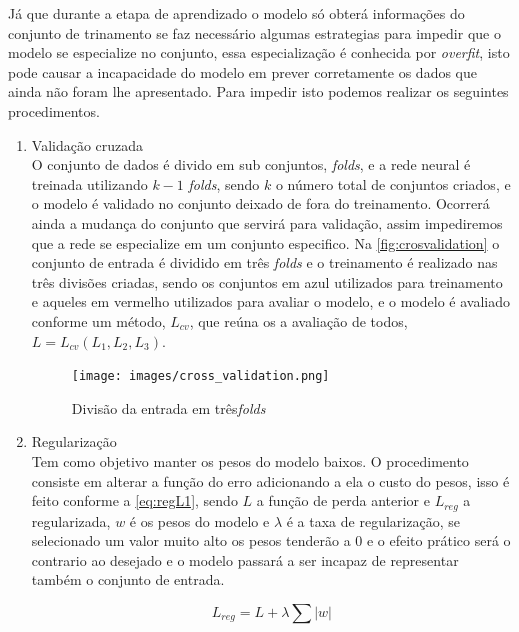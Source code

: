 \documentclass[
    12pt,
    oneside,
    a4paper,
    english,
    brazil
]{abntex2}
\begin{document}
Já  que durante  a  etapa de  aprendizado  o modelo  só  obterá informações  do
conjunto  de trinamento  se  faz necessário  algumas  estrategias para  impedir
que  o modelo  se  especialize  no conjunto,  essa  especialização é  conhecida
por  \textit{overfit}, isto  pode causar  a  incapacidade do  modelo em  prever
corretamente os  dados que ainda não  foram lhe apresentado. Para  impedir isto
podemos realizar os seguintes procedimentos.

\begin{enumerate}
    \item Validação cruzada\\
        O conjunto de dados é divido em sub conjuntos, \textit{folds}, e a rede
        neural é treinada  utilizando $k-1$ \textit{folds}, sendo  $k$ o número
        total de conjuntos  criados, e o modelo é validado  no conjunto deixado
        de  fora do  treinamento.  Ocorrerá  ainda a  mudança  do conjunto  que
        servirá para validação, assim impediremos  que a rede se especialize em
        um conjunto  especifico. Na \autoref{fig:crosvalidation} o  conjunto de
        entrada é dividido  em três \textit{folds} e o  treinamento é realizado
        nas três divisões  criadas, sendo os conjuntos em  azul utilizados para
        treinamento e aqueles em vermelho utilizados para avaliar o modelo, e o
        modelo  é  avaliado  conforme  um  método, $L_{cv}$,  que  reúna  os  a
        avaliação de todos, $L = L_{cv}(L_1, L_2, L_3)$.

        \begin{figure}[ht]
            \centering
            \caption{Divisão da entrada em três\textit{folds}}\label{fig:crosvalidation}
            \texttt{[image: images/cross\_validation.png]}
        \end{figure}

    \item Regularização\\
        Tem  como objetivo  manter os  pesos do  modelo baixos.  O procedimento
        consiste  em alterar  a função  do erro  adicionando a  ela o  custo do
        pesos, isso é  feito conforme a \autoref{eq:regL1}, sendo  $L$ a função
        de perda anterior e $L_{reg}$ a  regularizada, $w$ é os pesos do modelo
        e $\lambda$  é a taxa de  regularização, se selecionado um  valor muito
        alto os  pesos tenderão a  $0$ e o efeito  prático será o  contrario ao
        desejado  e o  modelo passará  a ser  incapaz de  representar também  o
        conjunto de entrada.

        \begin{equation}\label{eq:regL1}
            L_{reg} = L + \lambda \sum{|w|}
        \end{equation}
\end{enumerate}
\end{document}

